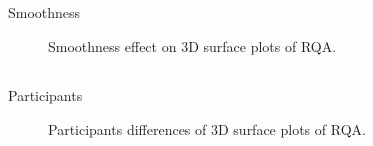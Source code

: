 \subsection{}
{

\begin{frame}{Smoothness}
    \begin{figure}
	\caption{Smoothness effect on 3D surface plots of RQA.} 
   \end{figure}
	
\end{frame}
}




\subsection{}
{

\begin{frame}{Participants}
    \begin{figure}
	\caption{Participants differences of 3D surface plots of RQA.} 
   \end{figure}
	
\end{frame}
}

%
%
%
%	
%

